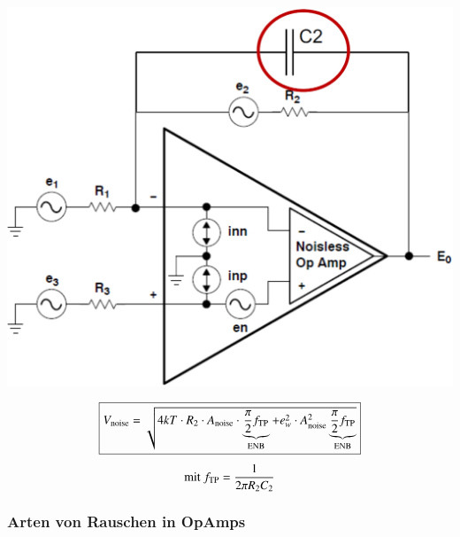 \begin{minipage}[c]{0.35\columnwidth}
    \includegraphics[width=\columnwidth]{images/rauschen_opamp_tiefpass.png}
\end{minipage}
\hfill
\begin{minipage}[c]{0.63\columnwidth}
    $$ \boxed{V_{\rm noise} = \sqrt{4 k T \cdot R_2 \cdot A_{\rm noise} \cdot \underbrace{ \frac{\pi}{2} f_{\rm TP}}_{\text{ENB}}
+ e_w^2 \cdot A_{\rm noise}^2 \underbrace{ \frac{\pi}{2} f_{\rm TP }}_{\text{ENB}} }} $$
$$ \text{mit } f_{\rm TP} = \frac{1}{2 \pi R_2 C_2} $$  %
\end{minipage}


\subsubsection{Arten von Rauschen in OpAmps}

